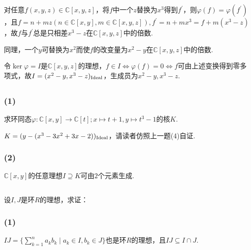  \jie 对任意$f(x,y,z)\in\mathbb{C}[x,y,z]$，将$f$中一个$z$替换为$x^3$得到$f^{\prime}$，则$\varphi(f)=\varphi(f^{\prime})$，且$f=n+mz (n\in\mathbb{C}[x,y],m\in\mathbb{C}[x,y,z]), f^{\prime}=n+mx^3=f+m(x^3-z)$，故$f$与$f^{\prime}$总是只相差$x^3-z$在$\mathbb{C}[x,y,z]$中的倍数.
 
 同理，一个$y$可替换为$x^2$而使$f$的改变量为$x^2-y$在$\mathbb{C}[x,y,z]$中的倍数.
 
 令$\ker\varphi=I$是$\mathbb{C}[x,y,z]$的理想，$f\in I\Leftrightarrow \varphi(f)=0\Leftrightarrow f$可由上述变换得到零多项式，故$I=(x^2-y,x^3-z)_{\operatorname{Ideal}}$，生成员为$x^2-y, x^3-z$.
 
 \subsection{}
 \subsubsection{(1)}
 求环同态$\varphi: \mathbb{C}[x,y]\rightarrow \mathbb{C}[t]; x\mapsto t+1, y\mapsto t^3-1$的核$K$.
 
 \jie $K=(y-(x^3-3x^2+3x-2))_{\operatorname{Ideal}}$，请读者仿照上一题(4)自证.
 
 \subsubsection{(2)}
 $\mathbb{C}[x,y]$的任意理想$I\supseteq K$可由$2$个元素生成.
 

\subsection{}
设$I,J$是环$R$的理想，求证：
\subsubsection{(1)}
$IJ=\{\sum_{k=1}^na_kb_k\mid a_k\in I, b_k\in J\}$也是环$R$的理想，且$IJ\subseteq I\cap J$.


